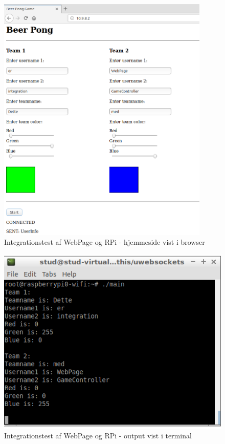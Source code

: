 \documentclass[Integrationstest/Integrationstest_main.tex]{subfiles}
\begin{document}
\begin{figure}[H]
    \centering
    \includegraphics[width=0.9\textwidth]{Integrationstest/WebPageogRPi/graphics/integrationstest1_web_game.png}
    \caption{Integrationstest af WebPage og RPi - hjemmeside vist i browser}
    \label{fig:Integration_1}
\end{figure}
\begin{figure}[H]
    \centering
    \includegraphics[width=\textwidth]{Integrationstest/WebPageogRPi/graphics/integrationstest2_web_game.png}
    \caption{Integrationstest af WebPage og RPi - output vist i terminal}
    \label{fig:Integration_2}
\end{figure}
\end{document}
